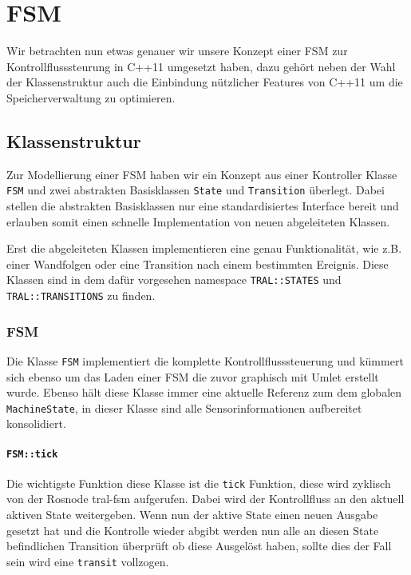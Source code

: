 \section{FSM}
\label{sec:fsm}

Wir betrachten nun etwas genauer wir unsere Konzept einer FSM zur 
Kontrollflusssteurung in C++11 umgesetzt haben, dazu gehört neben der Wahl 
der Klassenstruktur auch die Einbindung nützlicher Features von C++11 um die
Speicherverwaltung zu optimieren.


\subsection{Klassenstruktur}
Zur Modellierung einer FSM haben wir ein Konzept aus einer Kontroller Klasse \texttt{FSM} und zwei abstrakten Basisklassen \texttt{State} und \texttt{Transition} überlegt. Dabei stellen die abstrakten Basisklassen nur eine standardisiertes Interface bereit und erlauben somit einen schnelle Implementation von neuen abgeleiteten Klassen.


Erst die abgeleiteten Klassen implementieren eine genau Funktionalität, wie z.B. einer Wandfolgen oder eine Transition nach einem bestimmten Ereignis. Diese Klassen sind in dem dafür vorgesehen namespace \texttt{TRAL::STATES} und \texttt{TRAL::TRANSITIONS} zu finden.


\subsubsection{FSM}
Die Klasse \texttt{FSM} implementiert die komplette Kontrollflusssteuerung und kümmert sich ebenso um das Laden einer FSM die zuvor graphisch mit Umlet erstellt wurde. Ebenso hält diese Klasse immer eine aktuelle Referenz zum dem globalen \texttt{MachineState}, in dieser Klasse sind alle Sensorinformationen aufbereitet konsolidiert.

\paragraph{\texttt{FSM::tick}}

Die wichtigste Funktion diese Klasse ist die \texttt{tick} Funktion, diese wird zyklisch von der Rosnode tral-fsm aufgerufen. Dabei wird der Kontrollfluss an den aktuell aktiven State weitergeben. Wenn nun der aktive State einen neuen Ausgabe gesetzt hat und die Kontrolle wieder abgibt werden nun alle an diesen State befindlichen Transition überprüft ob diese Ausgelöst haben, sollte dies der Fall sein wird eine \texttt{transit} vollzogen.

